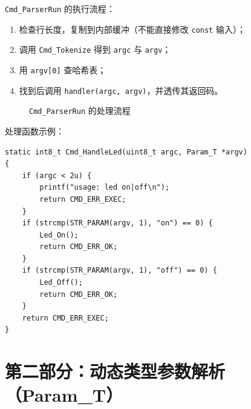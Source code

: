 \texttt{Cmd\_ParserRun} 的执行流程：

\begin{enumerate}
\item 检查行长度，复制到内部缓冲（不能直接修改 \texttt{const} 输入）；
\item 调用 \texttt{Cmd\_Tokenize} 得到 \texttt{argc} 与 \texttt{argv}；
\item 用 \texttt{argv[0]} 查哈希表；
\item 找到后调用 \texttt{handler(argc, argv)}，并透传其返回码。
\end{enumerate}

\begin{figure}[htbp]
\centering
\caption{\texttt{Cmd\_ParserRun} 的处理流程} \label{fig:cmd-flow}
\end{figure}

处理函数示例：

\begin{lstlisting}[style=c]
static int8_t Cmd_HandleLed(uint8_t argc, Param_T *argv)
{
    if (argc < 2u) {
        printf("usage: led on|off\n");
        return CMD_ERR_EXEC;
    }
    if (strcmp(STR_PARAM(argv, 1), "on") == 0) {
        Led_On();
        return CMD_ERR_OK;
    }
    if (strcmp(STR_PARAM(argv, 1), "off") == 0) {
        Led_Off();
        return CMD_ERR_OK;
    }
    return CMD_ERR_EXEC;
}
\end{lstlisting}

\section{第二部分：动态类型参数解析（Param\_T）}

